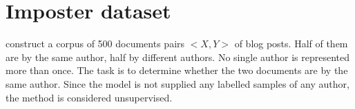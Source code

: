 \section{Imposter dataset}
\label{sec:imposter_dataset}

\citet{koppel_determining_2014} construct a corpus of 500 documents pairs $<X,Y>$ of blog posts.
Half of them are by the same author, half by different authors.
No single author is represented more than once.
The task is to determine whether the two documents are by the same author.
Since the model is not supplied any labelled samples of any author, the method is considered unsupervised.